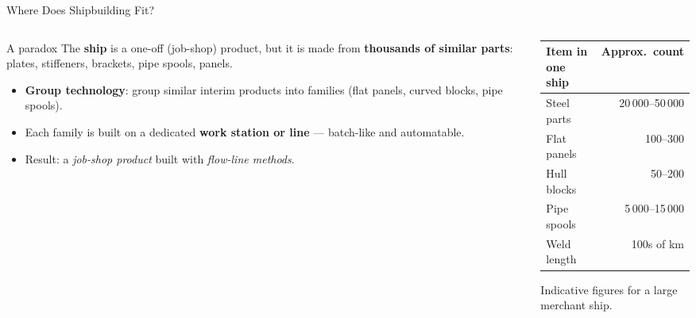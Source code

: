 \documentclass[aspectratio=169]{beamer}
\begin{document}
	\begin{frame}{Where Does Shipbuilding Fit?}
		\begin{columns}[T]
			\begin{column}{0.55\textwidth}
				\begin{block}{A paradox}
					\small The \textbf{ship} is a one-off (job-shop) product, but it is made from \textbf{thousands of similar parts}: plates, stiffeners, brackets, pipe spools, panels.
				\end{block}
				\begin{itemize}\small
					\item \textbf{Group technology}: group similar interim products into families (flat panels, curved blocks, pipe spools).
					\item Each family is built on a dedicated \textbf{work station or line} --- batch-like and automatable.
					\item Result: a \emph{job-shop product} built with \emph{flow-line methods}.
				\end{itemize}
			\end{column}
			\begin{column}{0.45\textwidth}
				\renewcommand{\arraystretch}{1.25}
				\centering
				\small
				\begin{tabular}{@{}lr@{}}
					\toprule
					\textbf{Item in one ship} & \textbf{Approx.\ count} \\
					\midrule
					Steel parts        & 20\,000--50\,000 \\
					Flat panels        & 100--300 \\
					Hull blocks        & 50--200 \\
					Pipe spools        & 5\,000--15\,000 \\
					Weld length        & 100s of km \\
					\bottomrule
				\end{tabular}
				\vspace{0.1cm}

				\footnotesize Indicative figures for a large merchant ship.
			\end{column}
		\end{columns}
	\end{frame}
\end{document}
